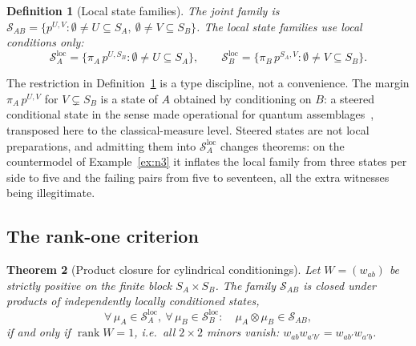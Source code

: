 \documentclass[11pt,a4paper]{article}
\newtheorem{theorem}{Theorem}[section]
\newtheorem{definition}[theorem]{Definition}
\newcommand{\SAB}{\mathcal{S}_{AB}}
\newcommand{\SAloc}{\mathcal{S}_A^{\mathrm{loc}}}
\newcommand{\SBloc}{\mathcal{S}_B^{\mathrm{loc}}}
\newcommand{\rk}{\operatorname{rank}}
\begin{document}
    \begin{definition}[Local state families]
      \label{def:local-families}
      The joint family is $\SAB = \{ p^{U,V} : \emptyset \neq U \subseteq S_A,\ \emptyset \neq V \subseteq S_B \}$.
      The \emph{local} state families use local conditions only:
      \begin{equation}
        \SAloc = \{ \pi_A\, p^{U, S_B} : \emptyset \neq U \subseteq S_A \},
        \qquad
        \SBloc = \{ \pi_B\, p^{S_A, V} : \emptyset \neq V \subseteq S_B \}.
      \end{equation}
    \end{definition}

    The restriction in Definition~\ref{def:local-families} is a type discipline, not a convenience.
    The margin $\pi_A\, p^{U,V}$ for $V \subsetneq S_B$ is a state of $A$ obtained by conditioning on $B$:
    a steered conditional state in the sense made operational for quantum
    assemblages~\cite{Schrodinger1935,Schrodinger1936,WisemanJonesDoherty2007}, transposed here to the
    classical-measure level.
    Steered states are not local preparations, and admitting them into $\SAloc$ changes theorems: on the
    countermodel of Example~\ref{ex:n3} it inflates the local family from three states per side to five and
    the failing pairs from five to seventeen, all the extra witnesses being illegitimate.

  \subsection{The rank-one criterion}
    \label{ssec:rankone}

    \begin{theorem}[Product closure for cylindrical conditionings]
      \label{thm:rankone}
      Let $W = (w_{ab})$ be strictly positive on the finite block $S_A \times S_B$.
      The family $\SAB$ is closed under products of independently locally conditioned states,
      \begin{equation}
        \forall\, \mu_A \in \SAloc,\ \forall\, \mu_B \in \SBloc \colon
        \quad
        \mu_A \otimes \mu_B \in \SAB,
      \end{equation}
      if and only if $\rk W = 1$, i.e.\ all $2 \times 2$ minors vanish:
      $w_{ab} w_{a'b'} = w_{ab'} w_{a'b}$.
    \end{theorem}
\end{document}

